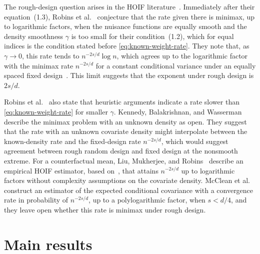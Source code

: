 The rough-design question arises in the HOIF
literature~\cite{hoif2008,robins2009,li2011,robins}. Immediately after
their equation~(1.3), Robins et al.~\cite[p.~338]{hoif2008} conjecture
that the rate given there is minimax, up to logarithmic factors, when
the nuisance functions are equally smooth and the density
smoothness $\gamma$ is too small for their condition~(1.2), which for
equal indices is the condition stated before
\eqref{eq:known-weight-rate}. They note that, as $\gamma\to0$, this rate
tends to $n^{-2s/d}\log n$, which agrees up to the logarithmic factor
with the minimax rate $n^{-2s/d}$ for a constant conditional variance
under an equally spaced fixed design~\cite{wangvariance,caivariance}.
This limit suggests that the exponent under rough design is $2s/d$.

Robins et al.~\cite[Section~3.1]{robins} also state that heuristic
arguments indicate a rate slower than \eqref{eq:known-weight-rate} for
smaller $\gamma$. Kennedy, Balakrishnan, and
Wasserman~\cite[Section~4]{kennedy2020discussion} describe the minimax
problem with an unknown density as open. They suggest that the rate
with an unknown covariate density might interpolate between the
known-density rate and the fixed-design rate $n^{-2s/d}$, which would
suggest agreement between rough random design and fixed design at the
nonsmooth extreme. For a counterfactual mean, Liu, Mukherjee, and
Robins~\cite[Section~4]{liumukherjeerobins2020} describe an empirical
HOIF estimator, based on~\cite{liu}, that attains $n^{-2s/d}$ up to
logarithmic factors without complexity assumptions on the covariate
density. McClean et al.~\cite[Section~4.2 and
Theorem~1]{mcclean} construct an estimator of the expected conditional
covariance with a convergence rate in probability of $n^{-2s/d}$, up to
a polylogarithmic factor, when $s<d/4$, and they leave open whether
this rate is minimax under rough design.

\section{Main results}\label{sec:intro-results}

